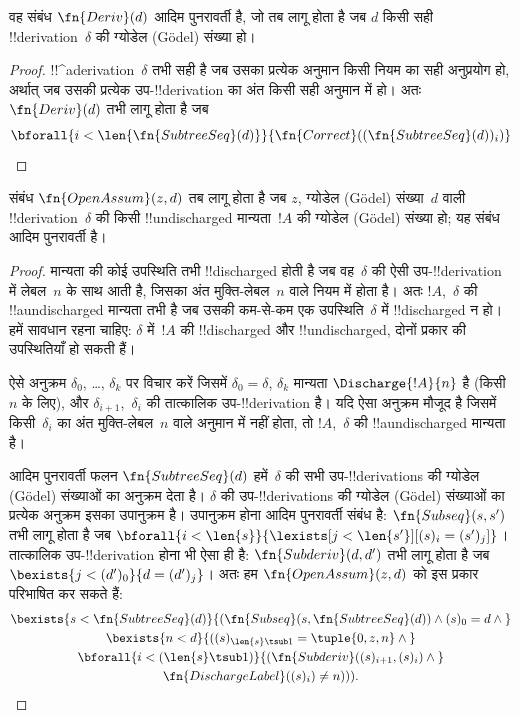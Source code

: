 \documentclass[../../../include/open-logic-section]{subfiles}
\begin{document}
\begin{prop}
  वह संबंध $\fn{Deriv}(d)$ आदिम पुनरावर्ती है, जो तब लागू होता है जब $d$
  किसी सही !!{derivation}~$\delta$ की ग्योडेल (G\"odel) संख्या हो।
\end{prop}

\begin{proof}
  !!^a{derivation}~$\delta$ तभी सही है जब उसका प्रत्येक अनुमान किसी नियम
  का सही अनुप्रयोग हो, अर्थात् जब उसकी प्रत्येक उप-!!{derivation} का अंत
  किसी सही अनुमान में हो। अतः $\fn{Deriv}(d)$ तभी लागू होता है जब
  \[
  \bforall{i<\len{\fn{SubtreeSeq}(d)}}{\fn{Correct}((\fn{SubtreeSeq}(d))_i)}
  \]
\end{proof}

\begin{prop}
   संबंध $\fn{OpenAssum}(z, d)$ तब लागू होता है जब
  $z$, ग्योडेल (G\"odel) संख्या~$d$ वाली !!{derivation}~$\delta$ की किसी
  !!{undischarged} मान्यता~$!A$ की ग्योडेल (G\"odel) संख्या हो; यह संबंध
  आदिम पुनरावर्ती है।
\end{prop}

\begin{proof}
  मान्यता की कोई उपस्थिति तभी !!{discharged} होती है जब वह~$\delta$ की ऐसी
  उप-!!{derivation} में लेबल~$n$ के साथ आती है, जिसका अंत मुक्ति-लेबल~$n$
  वाले नियम में होता है। अतः $!A$,~$\delta$ की !!a{undischarged} मान्यता
  तभी है जब उसकी कम-से-कम एक उपस्थिति~$\delta$ में !!{discharged} न हो।
  हमें सावधान रहना चाहिए: $\delta$ में~$!A$ की !!{discharged} और
  !!{undischarged}, दोनों प्रकार की उपस्थितियाँ हो सकती हैं।

  ऐसे अनुक्रम $\delta_0$, \dots, $\delta_k$ पर विचार करें जिसमें
  $\delta_0 = \delta$, $\delta_k$ मान्यता $\Discharge{!A}{n}$ है
  (किसी~$n$ के लिए), और $\delta_{i+1}$,~$\delta_i$ की तात्कालिक
  उप-!!{derivation} है। यदि ऐसा अनुक्रम मौजूद है जिसमें किसी~$\delta_i$
  का अंत मुक्ति-लेबल~$n$ वाले अनुमान में नहीं होता, तो $!A$,~$\delta$ की
  !!a{undischarged} मान्यता है।

  आदिम पुनरावर्ती फलन $\fn{SubtreeSeq}(d)$ हमें~$\delta$ की सभी
  उप-!!{derivation}s की ग्योडेल (G\"odel) संख्याओं का अनुक्रम देता है।
  $\delta$ की उप-!!{derivation}s की ग्योडेल (G\"odel) संख्याओं का प्रत्येक
  अनुक्रम इसका उपानुक्रम है। उपानुक्रम होना आदिम पुनरावर्ती संबंध है:
  $\fn{Subseq}(s, s')$ तभी लागू होता है जब
  $\bforall{i<\len{s}}{\lexists[j<\len{s'}][(s)_i = (s')_j]}$। तात्कालिक
  उप-!!{derivation} होना भी ऐसा ही है: $\fn{Subderiv}(d, d')$ तभी लागू होता
  है जब $\bexists{j<(d')_0}{d = (d')_j}$। अतः हम
  $\fn{OpenAssum}(z, d)$ को इस प्रकार परिभाषित कर सकते हैं:
  \begin{multline*}
    \bexists{s<\fn{SubtreeSeq}(d)}{(\fn{Subseq}(s, \fn{SubtreeSeq}(d))
      \land (s)_0 = d \land {}} \\
    \bexists{n<d}{((s)_{\len{s} \tsub 1} = \tuple{0, z, n} \land {}}\\
      \bforall{i<(\len{s} \tsub 1)}{(\fn{Subderiv}((s)_{i+1}, (s)_i) \land {}}\\
      \fn{DischargeLabel}((s)_i) \neq n))).
  \end{multline*}
\end{proof}
\end{document}
